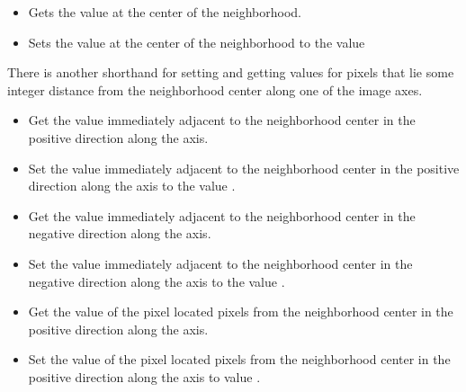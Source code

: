 {\begin{itemize}
\item \textbf{} Gets the value at the center
of the neighborhood.

\item \textbf{} Sets the value at the
center of the neighborhood to the value 

\end{itemize}

There is another shorthand for setting and getting values for pixels that
lie some integer distance from the neighborhood center along one of the image
axes.

\begin{itemize}

\item \textbf{} Get the value
immediately adjacent to the neighborhood center in the positive direction along
the  axis.

\item \textbf{} Set the value
immediately adjacent to the neighborhood center in the positive direction along
the  axis to the value .

\item \textbf{} Get the value
immediately adjacent to the neighborhood center in the negative direction along
the  axis.

\item \textbf{} Set the value
immediately adjacent to the neighborhood center in the negative direction along
the  axis to the value .

\item \textbf{} Get the
value of the pixel located  pixels from the neighborhood center in the positive
direction along the  axis.

\item \textbf{}
Set the value of the pixel located  pixels from the neighborhood center
in the positive direction along the  axis to value .


\end{itemize}}
